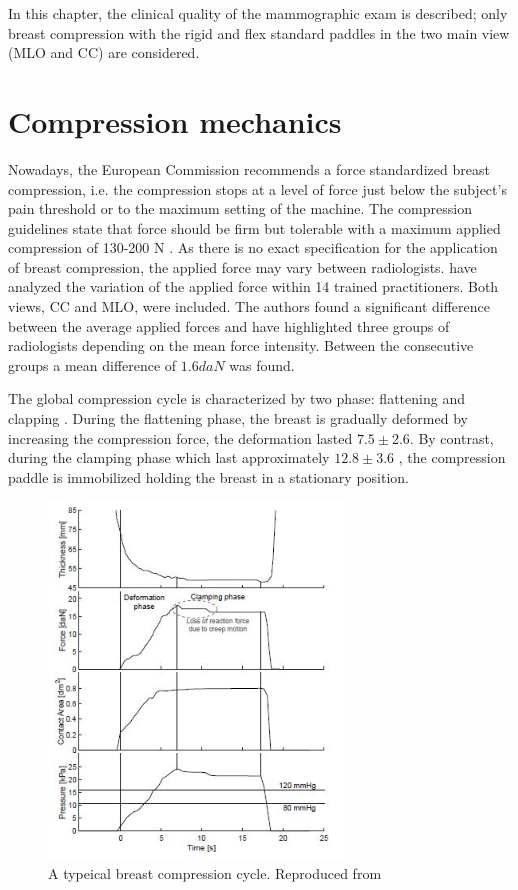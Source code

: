 In this chapter, the clinical quality of the mammographic exam is described; only breast compression with the rigid and flex standard paddles in the two main view (MLO and CC) are considered.

\section{Compression mechanics} \label{subsec:compressionmechanics}
Nowadays, the European Commission recommends a force standardized breast compression, i.e. the compression stops at a level of force just below the subject’s pain threshold or to the maximum setting of the machine.  The compression guidelines state that force should be firm but tolerable with a maximum applied compression of 130-200 N \citep{perry_european_2008}. As there is no exact specification for the application of breast compression, the applied force may vary between radiologists. \cite{mercer_practitioner_2013} have analyzed the variation of the applied force within 14 trained practitioners. Both views, CC and MLO, were included. The authors found a significant difference between the average applied forces and have highlighted three groups of radiologists depending on the mean force intensity. Between the consecutive groups a mean difference of $1.6daN$ was found. 

The global compression cycle is characterized by two phase: flattening and clapping \cite{de_pain_2015} . During the flattening phase, the breast is gradually  deformed by increasing the compression force, the deformation lasted  $7.5 \pm 2.6$. By contrast, during the clamping phase which last approximately $12.8 \pm 3.6$ , the compression paddle is immobilized holding the breast in a stationary position. 
\begin{figure}[!h]
\centering
\includegraphics[width=0.7\textwidth,keepaspectratio]{figures/breast_compression_cycle.jpg} 
\caption{A typeical breast compression cycle. Reproduced from \cite{groot_towards_2015}}\label{fig:breast_compression_cycle}
\end{figure}

